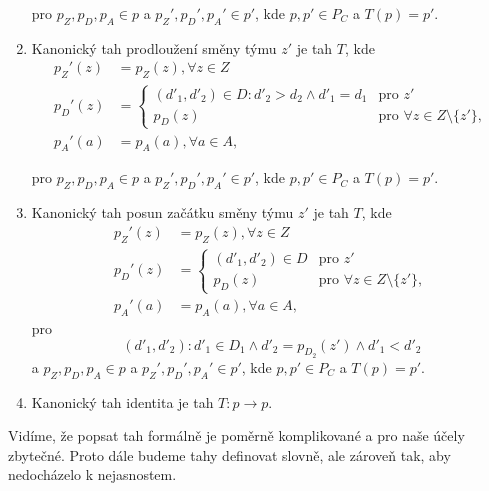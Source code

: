 \begin{definice}
\begin{enumerate}
      pro $p_Z, p_D, p_A \in p$ a $p_Z', p_D', p_A' \in p'$, kde $p, p' \in P_C$ a $T(p) = p'$.

    \item
      Kanonický tah prodloužení směny týmu $z'$ je tah $T$, kde
      \begin{align*}
        p_Z'(z) &= p_Z(z), \forall z \in Z \\
        p_D'(z) &=
          \begin{cases}
            (d'_1, d'_2) \in D \colon d'_2 > d_2 \land d'_1 = d_1  & \text{pro $z'$} \\
            p_D(z) & \text{pro $\forall z \in Z \setminus \{ z' \}$},
          \end{cases}
          \\
        p_A'(a) &= p_A(a), \forall a \in A,
      \end{align*}

      pro $p_Z, p_D, p_A \in p$ a $p_Z', p_D', p_A' \in p'$, kde $p, p' \in P_C$ a $T(p) = p'$.

    \item
      Kanonický tah posun začátku směny týmu $z'$ je tah $T$, kde
      \begin{align*}
        p_Z'(z) &= p_Z(z), \forall z \in Z \\
        p_D'(z) &=
          \begin{cases}
            (d'_1, d'_2) \in D   & \text{pro $z'$} \\
            p_D(z) & \text{pro $\forall z \in Z \setminus \{ z' \}$},
          \end{cases}
          \\
        p_A'(a) &= p_A(a), \forall a \in A,
      \end{align*}
      pro
      \begin{equation*}
        (d'_1, d'_2) \colon d'_1 \in D_1 \land d'_2 = p_{D_2}(z') \land d'_1 < d'_2
      \end{equation*}
      a $p_Z, p_D, p_A \in p$ a $p_Z', p_D', p_A' \in p'$, kde $p, p' \in P_C$ a $T(p) = p'$.

    \item
      Kanonický tah identita je tah $T: p \rightarrow p$.
  \end{enumerate}

\end{definice}

Vidíme, že popsat tah formálně je poměrně komplikované a pro naše účely zbytečné.
Proto dále budeme tahy definovat slovně, ale zároveň tak, aby nedocházelo k nejasnostem.

